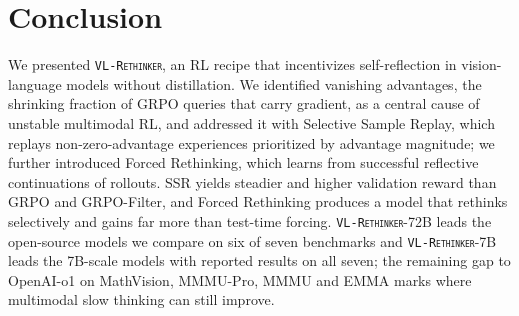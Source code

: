 \documentclass{article}
\newcommand{\model}{\texttt{\textsc{VL-Rethinker}}\xspace}
\begin{document}
\section{Conclusion}
\label{sec:conclusion}

We presented \model, an RL recipe that incentivizes self-reflection in vision-language models without distillation. We identified vanishing advantages, the shrinking fraction of GRPO queries that carry gradient, as a central cause of unstable multimodal RL, and addressed it with Selective Sample Replay, which replays non-zero-advantage experiences prioritized by advantage magnitude; we further introduced Forced Rethinking, which learns from successful reflective continuations of rollouts. SSR yields steadier and higher validation reward than GRPO and GRPO-Filter, and Forced Rethinking produces a model that rethinks selectively and gains far more than test-time forcing. \model-72B leads the open-source models we compare on six of seven benchmarks and \model-7B leads the 7B-scale models with reported results on all seven; the remaining gap to OpenAI-o1 on MathVision, MMMU-Pro, MMMU and EMMA marks where multimodal slow thinking can still improve.




\end{document}
